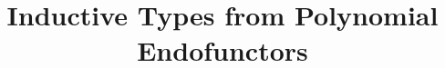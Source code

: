 \documentclass[acmsmall,screen]{acmart}
\begin{document}
\title{Inductive Types from Polynomial Endofunctors}

\maketitle






\end{document}
